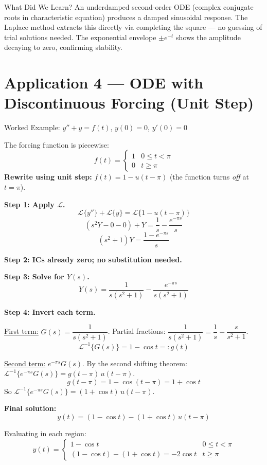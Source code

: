 \documentclass[12pt,a4paper]{article}
\begin{document}
\begin{learnbox}{What Did We Learn?}
An underdamped second-order ODE (complex conjugate roots in characteristic equation)
produces a damped sinusoidal response. The Laplace method extracts this directly via
completing the square --- no guessing of trial solutions needed. The exponential
envelope $\pm e^{-t}$ shows the amplitude decaying to zero, confirming stability.
\end{learnbox}

\section{Application 4 --- ODE with Discontinuous Forcing (Unit Step)}

\begin{infobox}{Worked Example: $y'' + y = f(t)$, $y(0)=0$, $y'(0)=0$}

The forcing function is piecewise:
\[
f(t) = \begin{cases} 1 & 0 \leq t < \pi \\ 0 & t \geq \pi \end{cases}
\]
\textbf{Rewrite using unit step:}
$f(t) = 1 - u(t-\pi)$ (the function turns \emph{off} at $t=\pi$).

\textbf{Step 1: Apply $\mathcal{L}$.}
\[
\mathcal{L}\{y''\} + \mathcal{L}\{y\} = \mathcal{L}\{1 - u(t-\pi)\}
\]
\[
(s^2Y - 0 - 0) + Y = \frac{1}{s} - \frac{e^{-\pi s}}{s}
\]
\[
(s^2+1)Y = \frac{1 - e^{-\pi s}}{s}
\]

\textbf{Step 2: ICs already zero; no substitution needed.}

\textbf{Step 3: Solve for $Y(s)$.}
\[
Y(s) = \frac{1}{s(s^2+1)} - \frac{e^{-\pi s}}{s(s^2+1)}
\]

\textbf{Step 4: Invert each term.}

\underline{First term:} $G(s) = \dfrac{1}{s(s^2+1)}$.
Partial fractions: $\dfrac{1}{s(s^2+1)} = \dfrac{1}{s} - \dfrac{s}{s^2+1}$.
\[
\mathcal{L}^{-1}\{G(s)\} = 1 - \cos t =: g(t)
\]

\underline{Second term:} $e^{-\pi s}G(s)$.
By the second shifting theorem:
$\mathcal{L}^{-1}\{e^{-\pi s}G(s)\} = g(t-\pi)\,u(t-\pi)$.
\[
g(t-\pi) = 1 - \cos(t-\pi) = 1 + \cos t
\]
So $\mathcal{L}^{-1}\{e^{-\pi s}G(s)\} = (1+\cos t)\,u(t-\pi)$.

\textbf{Final solution:}
\[
\boxed{y(t) = (1-\cos t) - (1+\cos t)\,u(t-\pi)}
\]

Evaluating in each region:
\[
y(t) = \begin{cases}
1 - \cos t & 0 \leq t < \pi \\
(1-\cos t)-(1+\cos t) = -2\cos t & t \geq \pi
\end{cases}
\]
\end{infobox}
\end{document}
